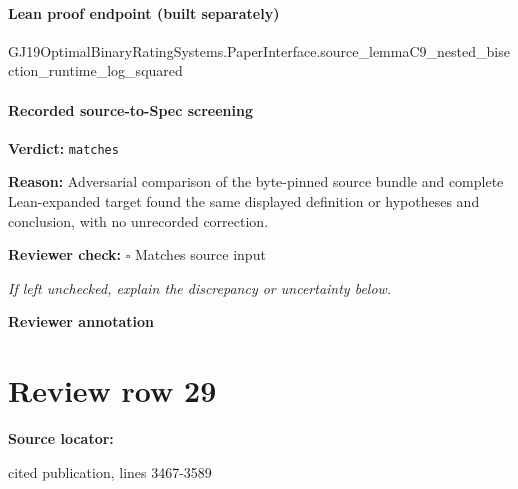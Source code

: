\documentclass[10pt]{article}
\newcommand{\reviewerbox}{%
  \par\noindent\fbox{\parbox{0.96\linewidth}{\rule{0pt}{0.38in}}}\par
}
\newcommand{\reviewmatch}[1]{%
  \par\noindent\textbf{Reviewer check:} $\square$\; #1\par
  \noindent\emph{If left unchecked, explain the discrepancy or uncertainty below.}\par
}
\begin{document}
\paragraph{Lean proof endpoint (built separately)}\begin{ReviewVerbatim}
GJ19OptimalBinaryRatingSystems.PaperInterface.source_lemmaC9_nested_bisection_runtime_log_squared
\end{ReviewVerbatim}

\paragraph{Recorded source-to-Spec screening}
\textbf{Verdict:} \texttt{matches}
\\
{\raggedright
\textbf{Reason:} Adversarial comparison of the byte-\allowbreak{}pinned source bundle and complete Lean-\allowbreak{}expanded target found the same displayed definition or hypotheses and conclusion, with no unrecorded correction.\allowbreak{}
\par}
\reviewmatch{Matches source input}
\noindent\textbf{Reviewer annotation}\par
\reviewerbox
\clearpage
\hypertarget{source-claim-51c42bc84b84361b}{}
\section*{Review row 29}
\textbf{Source locator:} {\footnotesize\raggedright cited publication, lines 3467-\allowbreak{}3589\par}
\end{document}
